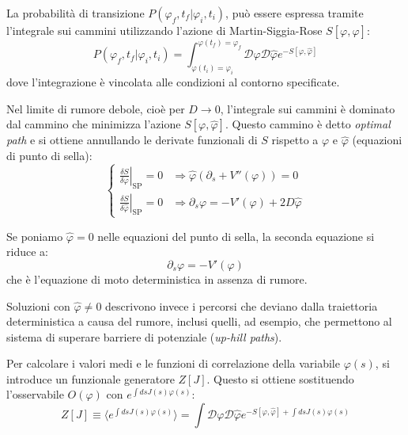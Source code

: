 La probabilità di transizione $P(\varphi_f, t_f | \varphi_i, t_i)$, può essere espressa tramite l'integrale sui cammini utilizzando l'azione di Martin-Siggia-Rose $S[\varphi,\hat{\varphi}]$:
\begin{equation}
P(\varphi_f, t_f | \varphi_i, t_i) = \int_{\varphi(t_i)=\varphi_i}^{\varphi(t_f)=\varphi_f}\mathcal{D}\varphi\mathcal{D}\hat{\varphi}e^{-S[\varphi,\hat{\varphi}]}
\end{equation}
dove l'integrazione è vincolata alle condizioni al contorno specificate.

Nel limite di rumore debole, cioè per $D\rightarrow0$, l'integrale sui cammini è dominato dal cammino che minimizza l'azione $S[\varphi,\hat{\varphi}]$. Questo cammino è detto \textit{optimal path} e si ottiene annullando le derivate funzionali di $S$ rispetto a $\varphi$ e $\hat{\varphi}$ (equazioni di punto di sella):
\begin{equation}
\begin{cases}
\left. \frac{\delta S}{\delta \varphi} \right|_{\text{SP}} = 0 & \Rightarrow \hat{\varphi} (\partial_s + V''(\varphi)) = 0 \\
\left. \frac{\delta S}{\delta \hat{\varphi}} \right|_{\text{SP}} = 0 & \Rightarrow \partial_s \varphi = -V'(\varphi) + 2D\hat{\varphi}
\end{cases}
\end{equation}

\noindent Se poniamo $\hat{\varphi}=0$ nelle equazioni del punto di sella, la seconda equazione si riduce a:
\begin{equation}
\partial_s\varphi = -V'(\varphi)
\end{equation}
che è l'equazione di moto deterministica in assenza di rumore. 

\noindent Soluzioni con $\hat{\varphi} \neq 0$ descrivono invece i percorsi che deviano dalla traiettoria deterministica a causa del rumore, inclusi quelli, ad esempio, che permettono al sistema di superare barriere di potenziale (\textit{up-hill paths}).

Per calcolare i valori medi e le funzioni di correlazione della variabile $\varphi(s)$, si introduce un funzionale generatore $Z[J]$. Questo si ottiene sostituendo l'osservabile $O(\varphi)$ con $e^{\int ds J(s)\varphi(s)}$:
\begin{equation}
Z[J]\equiv\langle e^{\int ds J(s)\varphi(s)}\rangle = \int\mathcal{D}\varphi\mathcal{D}\hat{\varphi}e^{-S[\varphi,\hat{\varphi}]+\int ds J(s)\varphi(s)}
\end{equation}

